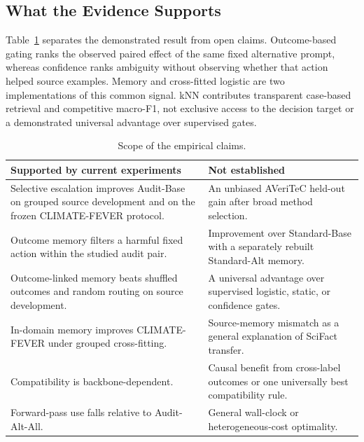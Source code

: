 \documentclass[runningheads]{llncs}
\begin{document}
\subsection{What the Evidence Supports}

Table~\ref{tab:claims} separates the demonstrated result from open claims.
Outcome-based gating ranks the observed paired effect of the same fixed
alternative prompt, whereas confidence ranks ambiguity without observing
whether that action helped source examples. Memory and cross-fitted logistic
are two implementations of this common signal. kNN contributes transparent
case-based retrieval and competitive macro-F1, not exclusive access to the
decision target or a demonstrated universal advantage over supervised gates.

\begin{table}[t]
\caption{Scope of the empirical claims.}
\label{tab:claims}
\centering\small
\begin{tabular}{p{.44\linewidth}p{.48\linewidth}}
\toprule
Supported by current experiments & Not established \\
\midrule
Selective escalation improves Audit-Base on grouped source development and on the
frozen CLIMATE-FEVER protocol. & An unbiased AVeriTeC held-out gain after broad
method selection. \\
Outcome memory filters a harmful fixed action within the studied audit pair. &
Improvement over Standard-Base with a separately rebuilt Standard-Alt memory. \\
Outcome-linked memory beats shuffled outcomes and random routing on source
development. & A universal advantage over supervised logistic, static, or
confidence gates. \\
In-domain memory improves CLIMATE-FEVER under grouped cross-fitting. &
Source-memory mismatch as a general explanation of SciFact transfer. \\
Compatibility is backbone-dependent. & Causal benefit from cross-label
outcomes or one universally best compatibility rule. \\
Forward-pass use falls relative to Audit-Alt-All. & General wall-clock or
heterogeneous-cost optimality. \\
\bottomrule
\end{tabular}
\end{table}
\end{document}
